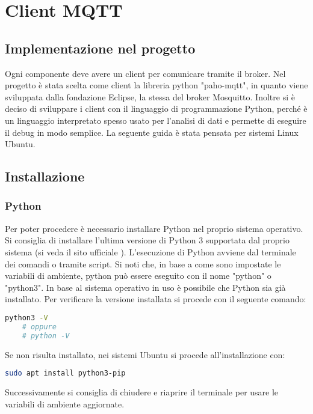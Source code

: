 
\chapter{Client MQTT}
\label{ch:client-mqtt}

\section{Implementazione nel progetto}
\label{sec:client-introduzione}
Ogni componente deve avere un client per comunicare tramite il broker.
Nel progetto è stata scelta come client la libreria python "paho-mqtt", in quanto viene sviluppata
dalla fondazione Eclipse, la stessa del broker Mosquitto.
Inoltre si è deciso di sviluppare i client con il linguaggio di programmazione Python,
perché è un linguaggio interpretato spesso usato per l'analisi di dati
e permette di eseguire il debug in modo semplice.
La seguente guida è stata pensata per sistemi Linux Ubuntu.

\section{Installazione}
\label{sec:client-installazione}

\subsection{Python}
\label{subsec:client-installazione-python}
Per poter procedere è necessario installare Python nel proprio sistema operativo.
Si consiglia di installare l'ultima versione di Python 3 supportata dal proprio sistema (si veda il sito ufficiale \cite{client-python}).
L'esecuzione di Python avviene dal terminale dei comandi o tramite script.
Si noti che, in base a come sono impostate le variabili di ambiente, 
python può essere eseguito con il nome "python" o "python3".
In base al sistema operativo in uso è possibile che Python sia già installato.
Per verificare la versione installata si procede con il seguente comando:
\begin{lstlisting}[language=bash]
	python3 -V
	# oppure
	# python -V
\end{lstlisting}
Se non risulta installato, nei sistemi Ubuntu si procede all'installazione con:
\begin{lstlisting}[language=bash]
	sudo apt install python3-pip
\end{lstlisting}
Successivamente si consiglia di chiudere e riaprire il terminale per usare le variabili di ambiente aggiornate.



